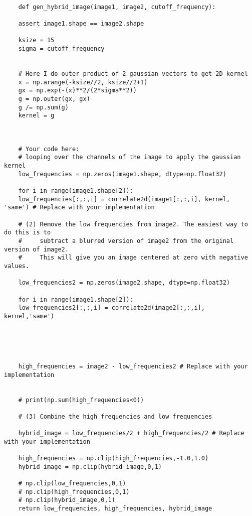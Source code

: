 \documentclass[11pt]{article}
\begin{document}
	
	\begin{lstlisting}
	
	def gen_hybrid_image(image1, image2, cutoff_frequency):
	
	assert image1.shape == image2.shape
	
	ksize = 15
	sigma = cutoff_frequency
	
	
	# Here I do outer product of 2 gaussian vectors to get 2D kernel
	x = np.arange(-ksize//2, ksize//2+1)
	gx = np.exp(-(x)**2/(2*sigma**2))
	g = np.outer(gx, gx)
	g /= np.sum(g)
	kernel = g
	
	
	
	# Your code here:
	# looping over the channels of the image to apply the gaussian kernel
	low_frequencies = np.zeros(image1.shape, dtype=np.float32)
	
	for i in range(image1.shape[2]):
	low_frequencies[:,:,i] = correlate2d(image1[:,:,i], kernel, 'same') # Replace with your implementation
	
	# (2) Remove the low frequencies from image2. The easiest way to do this is to
	#     subtract a blurred version of image2 from the original version of image2.
	#     This will give you an image centered at zero with negative values.
	
	low_frequencies2 = np.zeros(image2.shape, dtype=np.float32)
	
	for i in range(image1.shape[2]):
	low_frequencies2[:,:,i] = correlate2d(image2[:,:,i], kernel,'same')
	
	
	
	
	
	high_frequencies = image2 - low_frequencies2 # Replace with your implementation
	
	
	# print(np.sum(high_frequencies<0))
	
	# (3) Combine the high frequencies and low frequencies
	
	hybrid_image = low_frequencies/2 + high_frequencies/2 # Replace with your implementation
	
	high_frequencies = np.clip(high_frequencies,-1.0,1.0)
	hybrid_image = np.clip(hybrid_image,0,1)
	
	# np.clip(low_frequencies,0,1)
	# np.clip(high_frequencies,0,1)
	# np.clip(hybrid_image,0,1)
	return low_frequencies, high_frequencies, hybrid_image
	
	
	\end{lstlisting}
	
	\newpage
	
\end{document}

